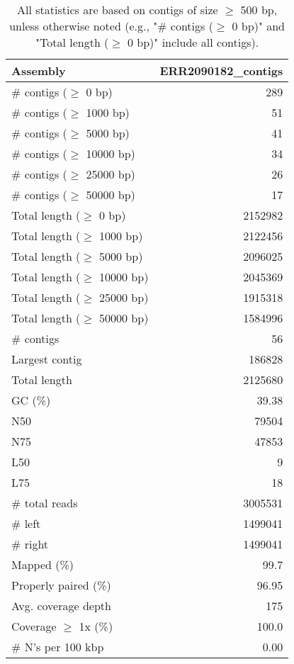 \documentclass[12pt,a4paper]{article}
\begin{document}
\begin{table}[ht]
\begin{center}
\caption{All statistics are based on contigs of size $\geq$ 500 bp, unless otherwise noted (e.g., "\# contigs ($\geq$ 0 bp)" and "Total length ($\geq$ 0 bp)" include all contigs).}
\begin{tabular}{|l*{1}{|r}|}
\hline
Assembly & ERR2090182\_contigs \\ \hline
\# contigs ($\geq$ 0 bp) & 289 \\ \hline
\# contigs ($\geq$ 1000 bp) & 51 \\ \hline
\# contigs ($\geq$ 5000 bp) & 41 \\ \hline
\# contigs ($\geq$ 10000 bp) & 34 \\ \hline
\# contigs ($\geq$ 25000 bp) & 26 \\ \hline
\# contigs ($\geq$ 50000 bp) & 17 \\ \hline
Total length ($\geq$ 0 bp) & 2152982 \\ \hline
Total length ($\geq$ 1000 bp) & 2122456 \\ \hline
Total length ($\geq$ 5000 bp) & 2096025 \\ \hline
Total length ($\geq$ 10000 bp) & 2045369 \\ \hline
Total length ($\geq$ 25000 bp) & 1915318 \\ \hline
Total length ($\geq$ 50000 bp) & 1584996 \\ \hline
\# contigs & 56 \\ \hline
Largest contig & 186828 \\ \hline
Total length & 2125680 \\ \hline
GC (\%) & 39.38 \\ \hline
N50 & 79504 \\ \hline
N75 & 47853 \\ \hline
L50 & 9 \\ \hline
L75 & 18 \\ \hline
\# total reads & 3005531 \\ \hline
\# left & 1499041 \\ \hline
\# right & 1499041 \\ \hline
Mapped (\%) & 99.7 \\ \hline
Properly paired (\%) & 96.95 \\ \hline
Avg. coverage depth & 175 \\ \hline
Coverage $\geq$ 1x (\%) & 100.0 \\ \hline
\# N's per 100 kbp & 0.00 \\ \hline
\end{tabular}
\end{center}
\end{table}
\end{document}
